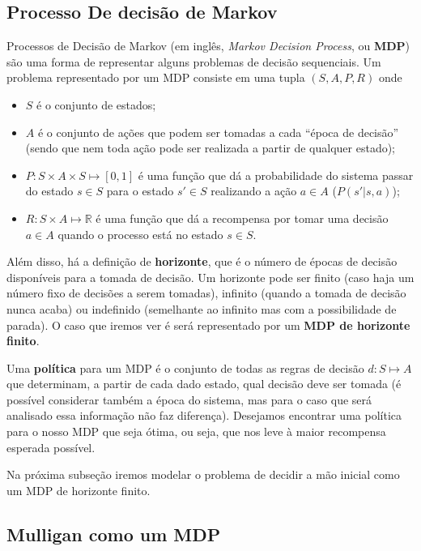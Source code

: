 \documentclass{book}
\begin{document}
\pagebreak
\subsection{Processo De decisão de Markov}

Processos de Decisão de Markov (em inglês, \textit{Markov Decision Process}, ou \textbf{MDP}) são uma forma de representar alguns problemas de decisão sequenciais. Um problema representado por um MDP consiste em
uma tupla $(S, A, P, R)$ onde
\begin{itemize}
  \item $S$ é o conjunto de estados;
  \item $A$ é o conjunto de ações que podem ser tomadas a cada ``época de decisão'' (sendo que nem toda ação pode ser realizada a partir de qualquer estado);
  \item $P: S \times A \times S \mapsto [0,1]$ é uma função que dá a probabilidade do sistema passar do estado $s \in S$ para o estado $s' \in S$
  realizando a ação $a \in A$ ($P(s'|s, a)$);
  \item $R: S \times A \mapsto \mathbb{R}$ é uma função que dá a recompensa por tomar uma decisão $a \in A$ quando o processo está no estado $s \in S$.
\end{itemize}

Além disso, há a definição de \textbf{horizonte}, que é o número de épocas de decisão disponíveis para a tomada de decisão. Um horizonte pode ser finito (caso haja
um número fixo de decisões a serem tomadas), infinito (quando a tomada de decisão nunca acaba) ou indefinido (semelhante ao infinito mas com a possibilidade de parada).
O caso que iremos ver é será representado por um \textbf{MDP de horizonte finito}.

Uma \textbf{política} para um MDP é o conjunto de todas as regras de decisão $d: S \mapsto A$ que determinam, a partir de cada dado estado, qual decisão deve ser tomada
(é possível considerar também a época do sistema, mas para o caso que será analisado essa informação não faz diferença). Desejamos encontrar uma política para o
nosso MDP que seja ótima, ou seja, que nos leve à maior recompensa esperada possível.

Na próxima subseção iremos modelar o problema de decidir a mão inicial como um MDP de horizonte finito.

\subsection{Mulligan como um MDP}
\end{document}

